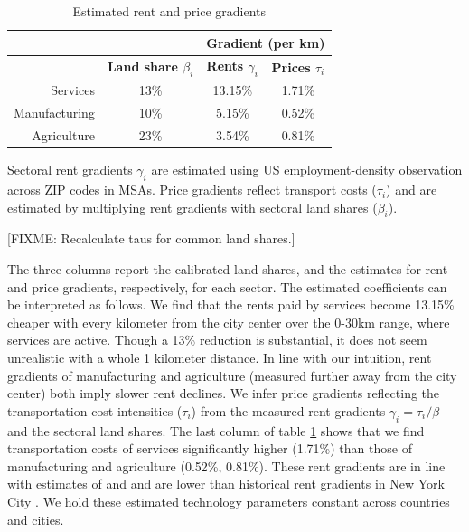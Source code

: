 \documentclass[12pt]{article}
\begin{document}
\begin{table}[h!]
  \begin{center}
  \caption{Estimated rent and price gradients}
    \begin{tabular}{rccc}
    \toprule
    \textbf{} & \textbf{} & \multicolumn{2}{c}{\textbf{Gradient (per km)}}\\
    \midrule
    \textbf{} & \textbf{Land share $\beta_i$ } & \textbf{Rents $\gamma_i$} & \textbf{Prices $\tau_i$} \\
    Services & 13\%  & 13.15\% & 1.71\% \\
    Manufacturing & 10\%  & 5.15\% & 0.52\% \\
    Agriculture & 23\%  & 3.54\% & 0.81\% \\
    \bottomrule
    \end{tabular}%

  \end{center}
  \label{tab:EmpGrad}%

  \noindent \footnotesize{Sectoral rent gradients $\gamma_i$ are estimated using US employment-density observation across ZIP codes in MSAs. Price gradients reflect transport costs ($\tau_i$) and are estimated by multiplying rent gradients with sectoral land shares ($\beta_i$). }
\end{table}%

[FIXME: Recalculate taus for common land shares.]

The three columns report the calibrated land shares, and the estimates for rent and price gradients, respectively, for each sector. The estimated coefficients can be interpreted as follows. We find that the rents paid by services become 13.15\% cheaper with every kilometer from the city center over the 0-30km range, where services are active. Though a 13\% reduction is substantial, it does not seem unrealistic with a whole 1 kilometer distance. In line with our intuition, rent gradients of manufacturing and agriculture (measured further away from the city center) both imply slower rent declines. We infer price gradients reflecting the transportation cost intensities ($\tau_i$) from the measured rent gradients $\gamma_i=\tau_i/\beta$ and the sectoral land shares. The last column of table \ref{tab:EmpGrad} shows that we find transportation costs of services significantly higher (1.71\%) than those of manufacturing and agriculture (0.52\%, 0.81\%). These rent gradients are in line with estimates of  and  and are lower than historical rent gradients in New York City \cite{Atack1998}. We hold these estimated technology parameters constant across countries and cities. 
\end{document}
